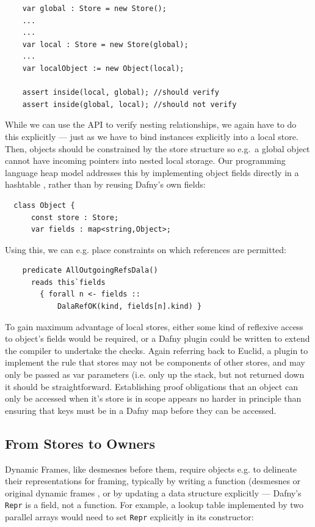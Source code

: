 \begin{lstlisting}
    var global : Store = new Store();
    ...
    ...
    var local : Store = new Store(global);
    ...
    var localObject := new Object(local);

    assert inside(local, global); //should verify
    assert inside(global, local); //should not verify
\end{lstlisting}

While we can use the API to verify nesting relationships, we again
have to do this explicitly --- just as we have to bind instances
explicitly into a local store.  Then, objects should be constrained by
the store structure so e.g.\ a global object cannot have incoming
pointers into nested local storage.  Our programming language heap
model addresses this by implementing object fields directly in a
hashtable \cite{dafnydala-ftfjp2024}, rather than by reusing Dafny's
own fields:
\pagebreak[3]

\begin{lstlisting}
  class Object {  
      const store : Store;
      var fields : map<string,Object>;  
\end{lstlisting}

Using this, we can e.g. place constraints on which references are
permitted:


\begin{lstlisting}
    predicate AllOutgoingRefsDala()
      reads this`fields
        { forall n <- fields ::
            DalaRefOK(kind, fields[n].kind) }
\end{lstlisting}

To gain maximum advantage of local stores, either some kind of
reflexive access to object's fields would be required, or a Dafny
plugin could be written to extend the compiler to undertake the
checks. Again referring back to Euclid, a plugin to implement the
rule that stores may not be components of other stores, and may only
be passed as var parameters (i.e. only up the stack,  but not returned
down it should be straightforward. Establishing proof obligations
that an object can only be accessed when it's store is in scope
appears no harder in principle than ensuring that keys must be in a
Dafny map before they can be accessed. 


\subsection{From Stores to Owners}

Dynamic Frames, like desmesnes before them, require objects e.g. to
delineate their representations for framing, typically by writing a
function (desmesnes \cite{wills91} or original dynamic frames
\cite{dynamic-frames-fm2006}, or by updating a data structure
explicitly --- Dafny's \lstinline+Repr+ is a field, not a function.
For example, a lookup table implemented by two parallel arrays
would need to set \lstinline+Repr+ explicitly in its constructor:

